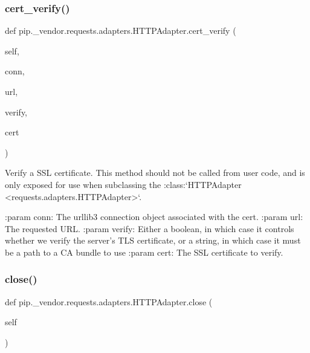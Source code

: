 \subsubsection{\texorpdfstring{cert\+\_\+verify()}{cert\_verify()}}
{\footnotesize\ttfamily def pip.\+\_\+vendor.\+requests.\+adapters.\+H\+T\+T\+P\+Adapter.\+cert\+\_\+verify (\begin{DoxyParamCaption}\item[{}]{self,  }\item[{}]{conn,  }\item[{}]{url,  }\item[{}]{verify,  }\item[{}]{cert }\end{DoxyParamCaption})}

\begin{DoxyVerb}Verify a SSL certificate. This method should not be called from user
code, and is only exposed for use when subclassing the
:class:`HTTPAdapter <requests.adapters.HTTPAdapter>`.

:param conn: The urllib3 connection object associated with the cert.
:param url: The requested URL.
:param verify: Either a boolean, in which case it controls whether we verify
    the server's TLS certificate, or a string, in which case it must be a path
    to a CA bundle to use
:param cert: The SSL certificate to verify.
\end{DoxyVerb}
 \mbox{\label{classpip_1_1__vendor_1_1requests_1_1adapters_1_1HTTPAdapter_a0540e50f88f63545aa6ff41f238a939e}} 
\subsubsection{\texorpdfstring{close()}{close()}}
{\footnotesize\ttfamily def pip.\+\_\+vendor.\+requests.\+adapters.\+H\+T\+T\+P\+Adapter.\+close (\begin{DoxyParamCaption}\item[{}]{self }\end{DoxyParamCaption})}

